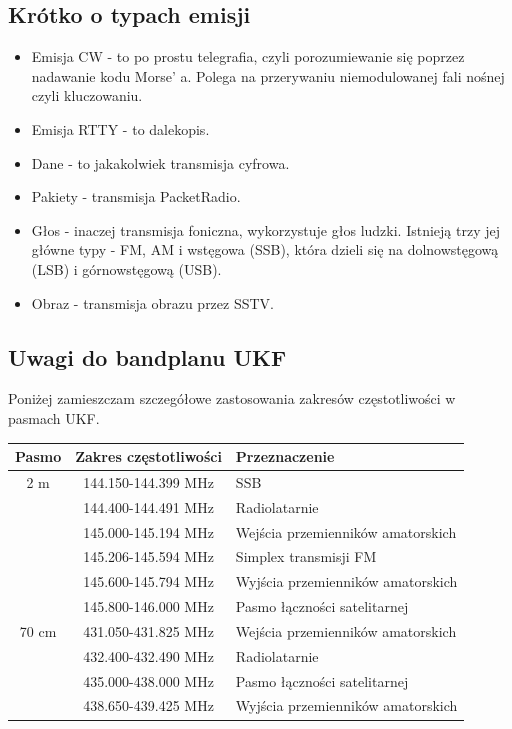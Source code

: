 \documentclass[a4paper,11pt]{article}
\begin{document}
\subsection{Krótko o typach emisji}
\begin{itemize}
\item Emisja CW - to po prostu telegrafia, czyli porozumiewanie się poprzez nadawanie kodu Morse' a. Polega na przerywaniu niemodulowanej fali nośnej czyli kluczowaniu.
\item Emisja RTTY - to dalekopis.
\item Dane - to jakakolwiek transmisja cyfrowa.
\item Pakiety - transmisja PacketRadio.
\item Głos - inaczej transmisja foniczna, wykorzystuje głos ludzki. Istnieją trzy jej główne typy - FM, AM i wstęgowa (SSB), która dzieli się na dolnowstęgową (LSB) i górnowstęgową (USB).
\item Obraz - transmisja obrazu przez SSTV.
\end{itemize}
\subsection{Uwagi do bandplanu UKF}
Poniżej zamieszczam szczegółowe zastosowania zakresów częstotliwości w pasmach UKF.
\begin{center}
\begin{tabular}{| c | c | p{8cm} |}
\hline
\textbf{Pasmo} & \textbf{Zakres częstotliwości} & \textbf{Przeznaczenie} \\ \hline
2 m & 144.150-144.399 MHz & SSB \\ \cline{2-3}
 & 144.400-144.491 MHz & Radiolatarnie \\ \cline{2-3}
 & 145.000-145.194 MHz & Wejścia przemienników amatorskich \\ \cline{2-3}
 & 145.206-145.594 MHz & Simplex transmisji FM \\ \cline{2-3}
 & 145.600-145.794 MHz & Wyjścia przemienników amatorskich \\ \cline{2-3}
 & 145.800-146.000 MHz & Pasmo łączności satelitarnej \\ \hline
70 cm & 431.050-431.825 MHz & Wejścia przemienników amatorskich \\ \cline{2-3}
 & 432.400-432.490 MHz & Radiolatarnie \\ \cline{2-3}
 & 435.000-438.000 MHz & Pasmo łączności satelitarnej \\ \cline{2-3}
 & 438.650-439.425 MHz & Wyjścia przemienników amatorskich \\ \hline
\end{tabular}
\end{center}
\end{document}
